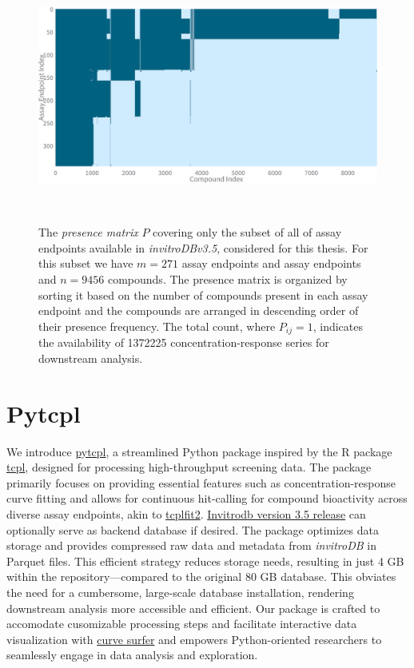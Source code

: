 \begin{figure}[h]  %
    \centering
    \includegraphics[width=1.0\textwidth]{figures/presence_matrix_subset.png}  
    \caption{The \emph{presence matrix} $P$ covering only the subset of all of assay endpoints available in \textit{invitroDBv3.5}, considered for this thesis. For this subset we have $m = \num{271}$ assay endpoints and assay endpoints and $n = \num{9456}$ compounds. The presence matrix is organized by sorting it based on the number of compounds present in each assay endpoint and the compounds are arranged in descending order of their presence frequency. The total count, where $P_{ij} = 1$, indicates the availability of \num{1372225} concentration-response series for downstream analysis.}
~\label{fig:presence_matrix_subset} 
\end{figure}

\section{Pytcpl}
We introduce \href{https://github.com/rbBosshard/pytcpl}{pytcpl}, a streamlined Python package inspired by the R package \href{https://github.com/USEPA/CompTox-ToxCast-tcpl}{tcpl}, designed for processing high-throughput screening data. The package primarily focuses on providing essential features such as concentration-response curve fitting and allows for continuous hit-calling for compound bioactivity across diverse assay endpoints, akin to \href{https://github.com/USEPA/CompTox-ToxCast-tcplFit2}{tcplfit2}. \href{https://cfpub.epa.gov/si/si_public_record_Report.cfm?dirEntryId=355484&Lab=CCTE}{Invitrodb version 3.5 release} can optionally serve as backend database if desired. The package optimizes data storage and provides compressed raw data and metadata from \emph{invitroDB} in Parquet files. This efficient strategy reduces storage needs, resulting in just 4 GB within the repository—compared to the original 80 GB database. This obviates the need for a cumbersome, large-scale database installation, rendering downstream analysis more accessible and efficient. Our package is crafted to accomodate cusomizable processing steps and facilitate interactive data visualization with \href{https://pytcpl.streamlit.app/}{curve surfer} and empowers Python-oriented researchers to seamlessly engage in data analysis and exploration.
